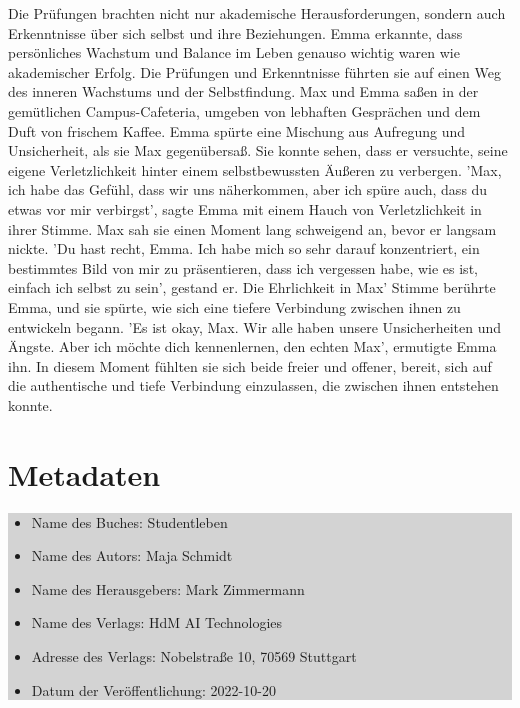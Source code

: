 \documentclass[12pt]{article} %
\begin{document}
Die Prüfungen brachten nicht nur akademische Herausforderungen, sondern auch Erkenntnisse über sich selbst und ihre Beziehungen. Emma erkannte, dass persönliches Wachstum und Balance im Leben genauso wichtig waren wie akademischer Erfolg. Die Prüfungen und Erkenntnisse führten sie auf einen Weg des inneren Wachstums und der Selbstfindung. Max und Emma saßen in der gemütlichen Campus-Cafeteria, umgeben von lebhaften Gesprächen und dem Duft von frischem Kaffee. Emma spürte eine Mischung aus Aufregung und Unsicherheit, als sie Max gegenübersaß. Sie konnte sehen, dass er versuchte, seine eigene Verletzlichkeit hinter einem selbstbewussten Äußeren zu verbergen. 'Max, ich habe das Gefühl, dass wir uns näherkommen, aber ich spüre auch, dass du etwas vor mir verbirgst', sagte Emma mit einem Hauch von Verletzlichkeit in ihrer Stimme. Max sah sie einen Moment lang schweigend an, bevor er langsam nickte. 'Du hast recht, Emma. Ich habe mich so sehr darauf konzentriert, ein bestimmtes Bild von mir zu präsentieren, dass ich vergessen habe, wie es ist, einfach ich selbst zu sein', gestand er. Die Ehrlichkeit in Max' Stimme berührte Emma, und sie spürte, wie sich eine tiefere Verbindung zwischen ihnen zu entwickeln begann. 'Es ist okay, Max. Wir alle haben unsere Unsicherheiten und Ängste. Aber ich möchte dich kennenlernen, den echten Max', ermutigte Emma ihn. In diesem Moment fühlten sie sich beide freier und offener, bereit, sich auf die authentische und tiefe Verbindung einzulassen, die zwischen ihnen entstehen konnte.

\clearpage

\section*{Metadaten}
\colorbox{lightgray}{
    \begin{minipage}{\dimexpr\textwidth-2\fboxsep}
        \vspace{1cm}
        \begin{itemize}
            \item Name des Buches: Studentleben
            \item Name des Autors: Maja Schmidt
            \item Name des Herausgebers: Mark Zimmermann
            \item Name des Verlags: HdM AI Technologies
            \item Adresse des Verlags: Nobelstraße 10, 70569 Stuttgart
            \item Datum der Veröffentlichung: 2022-10-20
        \end{itemize}
        \vspace{1cm}
    \end{minipage}
}
\end{document}
